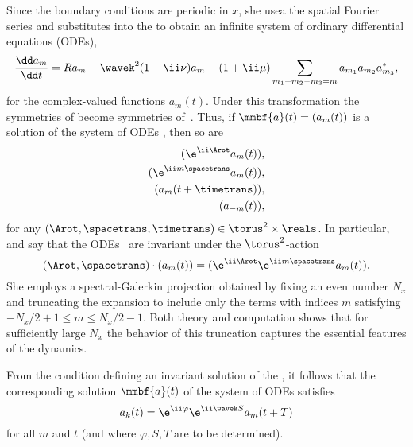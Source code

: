 \begin{description}
{Since the boundary conditions %
are periodic in $x$, she usea
the spatial Fourier series  and substitutes into the
{\cGLe} %
to obtain an infinite system of ordinary
differential equations ({ODEs}),
\begin{equation}   \label{eqn:odes}
    \frac {\dd a_{m}}{\dd t}  =  R a_m - \wavek^2 (1 + \ii\nu) a_m - (1 + \ii\mu) \sum_{m_1+m_2-m_3=m}
	a_{m_1} a_{m_2} a_{m_3}^{*},
\end{equation}
for the complex-valued functions $a_{m}(t)$.
Under this transformation the symmetries  of
{\cGLe} %
become symmetries of~.  Thus, if
$\mmbf{a}(t) = (a_{m}(t))$ is a solution of the
system of {ODEs} , then so are
\begin{align}
    (\e^{\ii\Arot} a_{m}(t))&,                    \label{odesym1} \\
    (\e^{\ii m\spacetrans} a_{m}(t))&,   \label{odesym2} \\
    (a_{m}( t + \timetrans))&,                 \label{odesym3} \\
    (a_{-m}( t))&,                                     \label{odesym4}
\end{align}
for any $(\Arot, \spacetrans, \timetrans) \in  \torus^2 \times \reals$.
In particular,  and  say that the
{ODEs}~ are invariant under the $\torus^2$-action
\begin{equation*}  \label{eqn:torusact}
    (\Arot, \spacetrans)\cdot (a_{m}(t))  = (\e^{\ii\Arot} \e^{\ii m \spacetrans} a_{m}(t)).
\end{equation*}
She employs a spectral-Galerkin projection obtained by fixing an even number
$N_x$ and truncating the expansion  to include only the
terms with indices $m$ satisfying $-N_x/2+1 \leq m \leq N_x/2-1$.
Both theory and computation shows that for sufficiently
large $N_x$ the behavior of this truncation captures the essential features of
the {\cGL} dynamics. %

From the condition  defining an invariant
solution of the {\cGLe}, it follows that the corresponding solution
$\mmbf{a}(t)$ of the system of {ODEs}  satisfies
\begin{equation}   \label{eqn:am_rpo}
    a_k(t)  =  \e^{\ii\varphi} \e^{\ii \wavek S} a_{m}(t +T)
\end{equation}
for all $m$ and $t$ (and where $\varphi, S, T$ are to be determined).

}
\end{description}
